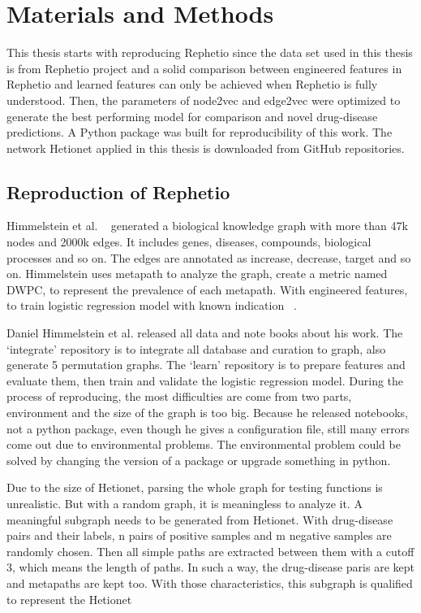 \chapter{Materials and Methods}
\label{methods}

This thesis starts with reproducing Rephetio since the data set used in this thesis is from Rephetio project and a solid comparison between engineered features in Rephetio and learned features can only be achieved when Rephetio is fully understood. Then, the parameters of node2vec and edge2vec were optimized to generate the best performing model for comparison and novel drug-disease predictions. A Python package was built for reproducibility of this work. The network Hetionet applied in this thesis is downloaded from GitHub repositories.

\section{Reproduction of Rephetio}

Himmelstein et al. ~\cite{himmelstein_systematic_2017} generated a biological knowledge graph with more than 47k nodes and 2000k edges. It includes genes, diseases, compounds, biological processes and so on. The edges are annotated as increase, decrease, target and so on. Himmelstein uses metapath to analyze the graph, create a metric named DWPC, to represent the prevalence of each metapath. With engineered features, to train logistic regression model with known indication ~\cite{himmelstein_heterogeneous_2015}.

Daniel Himmelstein et al. released all data and note books about his work. The ‘integrate’ repository is to integrate all database and curation to graph, also generate 5 permutation graphs. The ‘learn’ repository is to prepare features and evaluate them, then train and validate the logistic regression model. During the process of reproducing, the most difficulties are come from two parts, environment and the size of the graph is too big. Because he released notebooks, not a python package, even though he gives a configuration file, still many errors come out due to environmental problems. The environmental problem could be solved by changing the version of a package or upgrade something in python.

Due to the size of Hetionet, parsing the whole graph for testing functions is unrealistic. But with a random graph, it is meaningless to analyze it. A meaningful subgraph needs to be generated from Hetionet. With drug-disease pairs and their labels, n pairs of positive samples and m negative samples are randomly chosen. Then all simple paths are extracted between them with a cutoff 3, which means the length of paths. In such a way, the drug-disease paris are kept and metapaths are kept too. With those characteristics, this subgraph is qualified to represent the Hetionet

